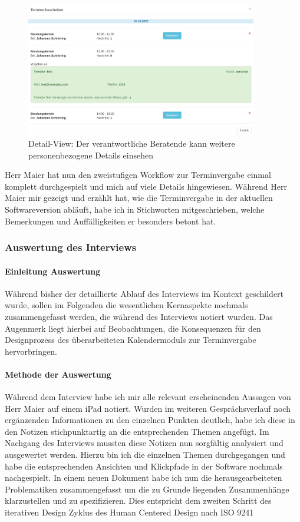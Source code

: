 \documentclass[12pt]{article}
\newcommand{\ipName}{Herr Maier }
\begin{document}
\begin{figure}[h]
    \caption{Detail-View: Der verantwortliche Beratende kann weitere personenbezogene Details einsehen}
    \centering
    \includegraphics[width=0.9\textwidth]{screen_old_assigned.png}
\end{figure}

\ipName hat nun den zweistufigen Workflow zur Terminvergabe einmal komplett
durchgespielt und mich auf viele Details hingewiesen. Während \ipName mir
gezeigt und erzählt hat, wie die Terminvergabe in der aktuellen Softwareversion
abläuft, habe ich in Stichworten mitgeschrieben, welche Bemerkungen und
Auffälligkeiten er besonders betont hat.

\subsubsection{Auswertung des Interviews}

\paragraph{Einleitung Auswertung}
Während bisher der detaillierte Ablauf des Interviews im Kontext geschildert
wurde, sollen im Folgenden die wesentlichen Kernaspekte nochmals
zusammengefasst werden, die während des Interviews notiert wurden. Das
Augenmerk liegt hierbei auf Beobachtungen, die Konsequenzen für den
Designprozess des überarbeiteten Kalendermoduls zur Terminvergabe
hervorbringen.

\paragraph{Methode der Auswertung}
Während dem Interview habe ich mir alle relevant erscheinenden Aussagen von
\ipName auf einem iPad notiert. Wurden im weiteren Gesprächsverlauf noch
ergänzenden Informationen zu den einzelnen Punkten deutlich, habe ich diese in
den Notizen stichpunktartig an die entsprechenden Themen angefügt. Im Nachgang
des Interviews mussten diese Notizen nun sorgfältig analysiert und ausgewertet
werden. Hierzu bin ich die einzelnen Themen durchgegangen und habe die
entsprechenden Ansichten und Klickpfade in der Software nochmals nachgespielt.
In einem neuen Dokument habe ich nun die herausgearbeiteten Problematiken
zusammengefasst um die zu Grunde liegenden Zusammenhänge klarzustellen und zu
spezifizieren. Dies entspricht dem zweiten Schritt des iterativen Design Zyklus
des Human Centered Design nach ISO 9241 \cite{iso9241}
\end{document}
